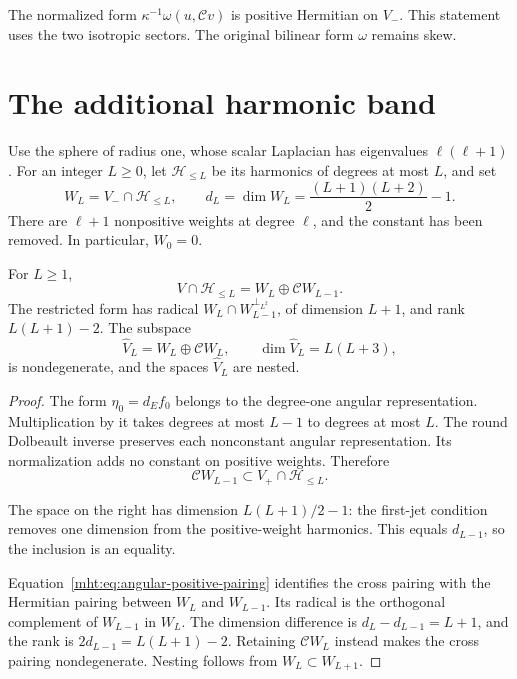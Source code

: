 The normalized form $\kappa^{-1}\omega(u,\mathcal Cv)$ is positive
Hermitian on $V_-$. This statement uses the two isotropic sectors.
The original bilinear form $\omega$ remains skew.

\section{The additional harmonic band}

Use the sphere of radius one, whose scalar Laplacian has eigenvalues
$\ell(\ell+1)$. For an integer $L\geq0$, let $\mathscr H_{\leq L}$
be its harmonics of degrees at most $L$, and set
\[
 W_L=V_-\cap\mathscr H_{\leq L},\qquad
 d_L=\dim W_L=\frac{(L+1)(L+2)}2-1.
\]
There are $\ell+1$ nonpositive weights at degree $\ell$, and the
constant has been removed. In particular, $W_0=0$.

\begin{proposition}\label{mht:prop:angular-radical}
For $L\geq1$,
\begin{equation}\label{mht:eq:angular-ordinary-cutoff}
 V\cap\mathscr H_{\leq L}=W_L\oplus\mathcal CW_{L-1}.
\end{equation}
The restricted form has radical
$W_L\cap W_{L-1}^{\perp_{L^2}}$, of dimension $L+1$, and rank
$L(L+1)-2$. The subspace
\begin{equation}\label{mht:eq:angular-staggered-space}
 \widehat V_L=W_L\oplus\mathcal CW_L,
 \qquad \dim\widehat V_L=L(L+3),
\end{equation}
is nondegenerate, and the spaces $\widehat V_L$ are nested.
\end{proposition}

\begin{proof}
The form $\eta_0=d_Ef_0$ belongs to the degree-one angular
representation. Multiplication by it takes degrees at most $L-1$
to degrees at most $L$. The round Dolbeault inverse preserves each
nonconstant angular representation. Its normalization adds no
constant on positive weights. Therefore
\[
 \mathcal CW_{L-1}\subset V_+\cap\mathscr H_{\leq L}.
\]

The space on the right has dimension $L(L+1)/2-1$: the first-jet
condition removes one dimension from the positive-weight harmonics.
This equals $d_{L-1}$, so the inclusion is an equality.

Equation~\eqref{mht:eq:angular-positive-pairing} identifies the
cross pairing with the Hermitian pairing between $W_L$ and $W_{L-1}$.
Its radical is the orthogonal complement of $W_{L-1}$ in $W_L$.
The dimension difference is $d_L-d_{L-1}=L+1$, and the rank is
$2d_{L-1}=L(L+1)-2$. Retaining $\mathcal CW_L$ instead makes the
cross pairing nondegenerate. Nesting follows from $W_L\subset W_{L+1}$.
\end{proof}

